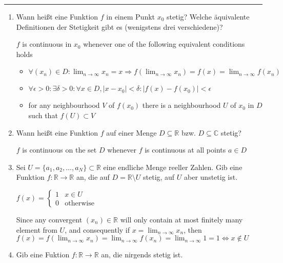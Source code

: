 \documentclass[11pt]{article}
\begin{document}
\Large




\medskip\hrule
\begin{enumerate}

\item Wann heißt eine Funktion $f$ in einem Punkt $x_0$ stetig? Welche äquivalente Definitionen der Stetigkeit gibt es (wenigstens drei verschiedene)?

$f$ is continuous in $x_0$ whenever one of the following equivalent conditions holds
\begin{itemize}
    \item $\forall (x_n) \in D\colon \lim_{n\to\infty}{x_n} = x \Rightarrow f(\lim_{n\to\infty}{x_n}) = f(x) = \lim_{n\to\infty}{f(x_n)}$
    \item $\forall \epsilon > 0\colon \exists \delta > 0\colon \forall x \in D, | x - x_0| < \delta\colon |f(x) - f(x_0)| < \epsilon$
    \item for any neighbourhood $V$ of $f(x_0)$ there is a neighbourhood $U$ of $x_0$ in $D$ such that $f(U) \subset V$
\end{itemize}

\item Wann heißt eine Funktion $f$ auf einer Menge $D \subseteq \mathbb{R}$ bzw. $D \subseteq \mathbb{C}$ stetig?

$f$ is continuous on the set $D$ whenever $f$ is continuous at all points $a \in D$

\item Sei $U = \{a_1, a_2, \dots, a_N \} \subset \mathbb{R}$ eine endliche Menge reeller Zahlen. Gib eine Funktion
$f\colon \mathbb{R} \to \mathbb{R}$ an, die auf $D = \mathbb{R} \setminus U$ stetig, auf $U$ aber unstetig ist.

$f(x) = \begin{cases}
    1& x \in U\\
    0&\text{otherwise}
\end{cases}$

Since any convergent $(x_n) \in \mathbb{R}$ will only contain at most finitely many element from $U$, and consequently if $x = \lim_{n \to \infty} x_n$, then $f(x) = f(\lim_{n \to \infty} x_n) = \lim_{n \to \infty} f(x_n) = \lim_{n \to \infty} 1 = 1 \Leftrightarrow x \notin U$

\item Gib eine Fuktion $f\colon \mathbb{R} \to \mathbb{R}$ an, die nirgends stetig ist.


\end{enumerate}
\end{document}
